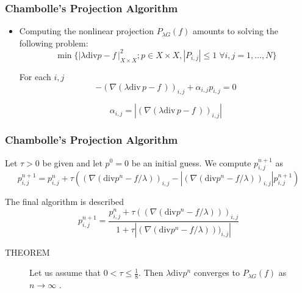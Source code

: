 \documentclass[notheorems,mathserif,table,compress]{beamer}  %
\begin{document}
%
\begin{frame}
\frametitle{Chambolle's Projection Algorithm} 
\begin{itemize}
\item Computing the nonlinear projection $P_{\lambda G}(f)$ amounts to solving the following problem:
\begin{displaymath}
\min\{|\lambda \textrm{div} p-f\,|^2_{X\times X};p\in X\times X,|P_{i,j}|\leq1\; \forall i,j=1,\ldots,N\}
\end{displaymath}

For each $i,j$
\begin{displaymath}
-(\nabla(\lambda\textrm{div}\, p−f\,))_{i,j}+\alpha_{i,j}p_{i,j}=0
\end{displaymath}

\begin{displaymath}
\alpha_{i,j}=|(\nabla(\lambda\textrm{div}\, p−f\,))_{i,j}|
\end{displaymath}

\end{itemize}
\end{frame}

%
\begin{frame}
\frametitle{Chambolle's Projection Algorithm} 
Let $\tau>0$ be given and let $p^0=0$ be an initial guess. We compute $p^{n+1}_{i,j}$ as
\begin{displaymath}
p_{i,j}^{n+1}=p_{i,j}^n+\tau((\nabla(\textrm{div} p^n−f/\lambda))_{i,j}−|(\nabla(\textrm{div} p^n−f/\lambda))_{i,j}|p_{i,j}^{n+1})
\end{displaymath}

The final algorithm is described
\begin{displaymath}
p_{i,j}^{n+1}=\frac{p_{i,j}^n+\tau((\nabla(\textrm{div} p^n−f/\lambda)))_{i,j}}{1+\tau|(\nabla(\textrm{div} p^n−f/\lambda)))_{i,j}|}
\end{displaymath}

\begin{description}
\item [THEOREM] Let us assume that $0<\tau\leq\frac{1}{8}$. Then $\lambda \textrm{div} p^n$ converges to $P_{\lambda G}(f)$ as $n\rightarrow\infty$ .
\end{description}

\end{frame}
\end{document}
